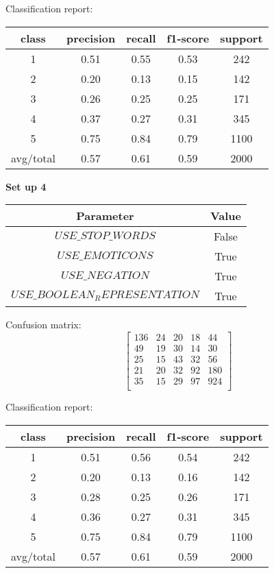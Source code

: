 \documentclass[12pt]{report}
\begin{document}
Classification report:

\begin{center}
	\begin{tabular}{c | c | c | c | c }
		\hline
		class & precision & recall & f1-score & support \\ \hline
		1 & 0.51 & 0.55 & 0.53 & 242 \\ \hline
		2 & 0.20 & 0.13 & 0.15 & 142 \\ \hline
		3 & 0.26 & 0.25 & 0.25 & 171 \\ \hline
		4 & 0.37 & 0.27 & 0.31 & 345 \\ \hline
		5 & 0.75 & 0.84 & 0.79 & 1100 \\ \hline
		avg/total & 0.57 & 0.61 & 0.59 & 2000 \\ \hline
	\end{tabular}
\end{center}


\textbf{Set up 4}

\begin{center}
	\begin{tabular}{ c | c }
		\hline
		Parameter & Value \\ \hline
		$USE\_STOP\_WORDS$ & False \\ \hline
		$USE\_EMOTICONS$ & True \\ \hline
		$USE\_NEGATION$ & True \\ \hline
		$USE\_BOOLEAN_REPRESENTATION$ & True \\ \hline
	\end{tabular}
\end{center}

Confusion matrix:
\[
\begin{bmatrix}
136 & 24 & 20 & 18 & 44 \\
49 & 19 & 30 & 14 & 30 \\
25 & 15 & 43 & 32 & 56 \\
21 & 20 & 32 & 92 & 180 \\
35 & 15 & 29 & 97 & 924 \\
\end{bmatrix}
\]

Classification report:

\begin{center}
	\begin{tabular}{c | c | c | c | c }
		\hline
		class & precision & recall & f1-score & support \\ \hline
		1 & 0.51 & 0.56 & 0.54 & 242 \\ \hline
		2 & 0.20 & 0.13 & 0.16 & 142 \\ \hline
		3 & 0.28 & 0.25 & 0.26 & 171 \\ \hline
		4 & 0.36 & 0.27 & 0.31 & 345 \\ \hline
		5 & 0.75 & 0.84 & 0.79 & 1100 \\ \hline
		avg/total & 0.57 & 0.61 & 0.59 & 2000 \\ \hline
	\end{tabular}
\end{center}
\end{document}
